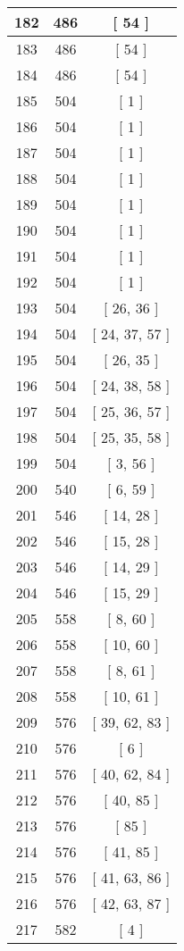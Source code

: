 \begin{center}
\begin{longtable}[H]{|| c c c ||}
\hline
182 & 486 & [ 54 ] \\ 
\hline
183 & 486 & [ 54 ] \\ 
\hline
184 & 486 & [ 54 ] \\ 
\hline
185 & 504 & [ 1 ] \\ 
\hline
186 & 504 & [ 1 ] \\ 
\hline
187 & 504 & [ 1 ] \\ 
\hline
188 & 504 & [ 1 ] \\ 
\hline
189 & 504 & [ 1 ] \\ 
\hline
190 & 504 & [ 1 ] \\ 
\hline
191 & 504 & [ 1 ] \\ 
\hline
192 & 504 & [ 1 ] \\ 
\hline
193 & 504 & [ 26, 36 ] \\ 
\hline
194 & 504 & [ 24, 37, 57 ] \\ 
\hline
195 & 504 & [ 26, 35 ] \\ 
\hline
196 & 504 & [ 24, 38, 58 ] \\ 
\hline
197 & 504 & [ 25, 36, 57 ] \\ 
\hline
198 & 504 & [ 25, 35, 58 ] \\ 
\hline
199 & 504 & [ 3, 56 ] \\ 
\hline
200 & 540 & [ 6, 59 ] \\ 
\hline
201 & 546 & [ 14, 28 ] \\ 
\hline
202 & 546 & [ 15, 28 ] \\ 
\hline
203 & 546 & [ 14, 29 ] \\ 
\hline
204 & 546 & [ 15, 29 ] \\ 
\hline
205 & 558 & [ 8, 60 ] \\ 
\hline
206 & 558 & [ 10, 60 ] \\ 
\hline
207 & 558 & [ 8, 61 ] \\ 
\hline
208 & 558 & [ 10, 61 ] \\ 
\hline
209 & 576 & [ 39, 62, 83 ] \\ 
\hline
210 & 576 & [ 6 ] \\ 
\hline
211 & 576 & [ 40, 62, 84 ] \\ 
\hline
212 & 576 & [ 40, 85 ] \\ 
\hline
213 & 576 & [ 85 ] \\ 
\hline
214 & 576 & [ 41, 85 ] \\ 
\hline
215 & 576 & [ 41, 63, 86 ] \\ 
\hline
216 & 576 & [ 42, 63, 87 ] \\ 
\hline
217 & 582 & [ 4 ] \\ 

\end{longtable}
\end{center}
